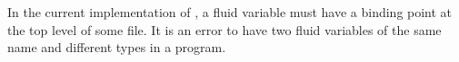 In the current implementation of \asharp{}, a fluid variable must
have a binding point at the top level of some file. It is an error to
have two fluid variables of the same name and different types in a
program.



